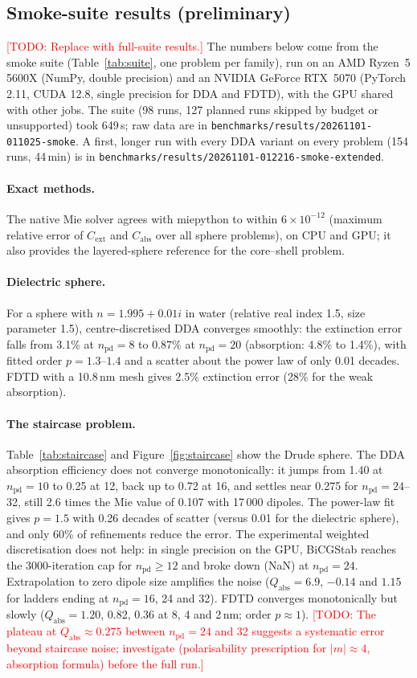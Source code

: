 \documentclass[11pt]{article}
\newcommand{\todo}[1]{\textcolor{red}{[TODO: #1]}}
\newcommand{\code}[1]{\texttt{#1}}
\newcommand{\npd}{n_\mathrm{pd}}
\newcommand{\Qabs}{Q_\mathrm{abs}}
\begin{document}
\subsection{Smoke-suite results (preliminary)}
\label{sec:smoke}
\todo{Replace with full-suite results.} The numbers below come from the smoke suite
(Table~\ref{tab:suite}, one problem per family), run on an AMD Ryzen~5 5600X (NumPy, double precision) and an NVIDIA GeForce RTX~5070 (PyTorch 2.11, CUDA 12.8, single precision for DDA and FDTD), with the GPU shared with other jobs. The suite (98 runs, 127 planned runs skipped by budget or unsupported) took 649\,s; raw data are in \code{benchmarks/results/20261101-011025-smoke}. A first, longer run with every DDA variant on every problem (154 runs, 44\,min) is in \code{benchmarks/results/20261101-012216-smoke-extended}.

\paragraph{Exact methods.} The native Mie solver agrees with miepython to within
$6\times10^{-12}$ (maximum relative error of $C_\mathrm{ext}$ and $C_\mathrm{abs}$ over all sphere
problems), on CPU and GPU; it also provides the layered-sphere reference for the core--shell problem.

\paragraph{Dielectric sphere.} For a sphere with $n=1.995+0.01i$ in water (relative real index 1.5, size
parameter 1.5), centre-discretised DDA converges smoothly: the extinction error falls from 3.1\% at
$\npd=8$ to 0.87\% at $\npd=20$ (absorption: 4.8\% to 1.4\%), with fitted order $p=1.3$--$1.4$ and a
scatter about the power law of only 0.01 decades. FDTD with a 10.8\,nm mesh gives 2.5\% extinction
error (28\% for the weak absorption).

\paragraph{The staircase problem.} Table~\ref{tab:staircase} and Figure~\ref{fig:staircase} show the
Drude sphere. The DDA absorption efficiency does not converge monotonically: it jumps from 1.40 at
$\npd=10$ to 0.25 at 12, back up to 0.72 at 16, and settles near 0.275 for $\npd=24$--32, still 2.6
times the Mie value of 0.107 with 17\,000 dipoles. The power-law fit gives $p=1.5$ with 0.26 decades of
scatter (versus 0.01 for the dielectric sphere), and only 60\% of refinements reduce the error. The
experimental weighted discretisation does not help: in single precision on the GPU, BiCGStab reaches
the 3000-iteration cap for $\npd\ge12$ and broke down (NaN) at $\npd=24$. Extrapolation to zero dipole
size amplifies the noise ($\Qabs=6.9$, $-0.14$ and $1.15$ for ladders ending at $\npd=16$, 24 and 32).
FDTD converges monotonically but slowly ($\Qabs=1.20$, 0.82, 0.36 at 8, 4 and 2\,nm; order
$p\approx1$). \todo{The plateau at $\Qabs\approx0.275$ between $\npd=24$ and 32 suggests a systematic
error beyond staircase noise; investigate (polarisability prescription for $|m|\approx4$, absorption
formula) before the full run.}
\end{document}

